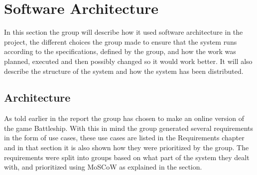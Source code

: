 
\chapter{Software Architecture}
In this section the group will describe how it used software architecture
 in the project, the different choices the group made to ensure that the
  system runs according to the specifications, defined by the group, and
   how the work was planned, executed and then possibly changed so it would
    work better. It will also describe the structure of the system and how
    the system has been distributed.
\\
\section{Architecture}
As told earlier in the report the group has chosen to make an online version
of the game Battleship. With this in mind the group generated several
requirements in the form of use cases, these use cases are listed in the
Requirements chapter and in that section it is also shown how they were
prioritized by the group. The requirements were split into groups based
on what part of the system they dealt with, and prioritized using MoSCoW
as explained in the section.
\\
